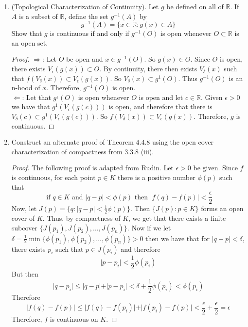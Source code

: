 \begin{enumerate}
    \item (Topological Characterization of Continuity). Let \( g \) be defined on all of \( \mathbb{R} \). If \( A \) is a subset of \( \mathbb{R} \), define the set \( g^{-1}(A) \) by
    \[
    g^{-1}(A) = \{ x \in \mathbb{R}: g(x) \in A \}
    \]
    Show that \( g \) is continuous if and only if \( g^{-1}(O) \) is open whenever \( O \subset \mathbb{R} \) is an open set.
    
    \begin{proof}
    \( \Rightarrow \): Let \( O \) be open and \( x \in g^{-1}(O) \). So \( g(x) \in O \). Since \( O \) is open, there exists \( V_{\epsilon}(g(x)) \subset O \). By continuity, there then exists \( V_{\delta}(x) \) such that \( f\left( V_{\delta}(x) \right) \subset V_{\epsilon}(g(x)) \). So \( V_{\delta}(x) \subset g^{1}(O) \). Thus \( g^{-1}(O) \) is an n-hood of \( x \). Therefore, \( g^{-1}(O) \) is open. 
    \\
    \(\Leftarrow \): Let that \( g^{_1}(O) \) is open whenever \( O \) is open and let \( c \in \mathbb{R} \). Given \( \epsilon > 0 \) we have that \( g^{1}(V_{\epsilon}(g(c))) \) is open, and therefore that there is \( V_{\delta}(c) \subset g^{1}(V_{\epsilon}(g(c))) \). So \( f(V_{\delta}(x)) \subset V_{\epsilon}(g(x)) \). Therefore, \( g \) is continuous. 
    \end{proof}
    
    \item Construct an alternate proof of Theorem 4.4.8 using the open cover characterization of compactness from 3.3.8 (iii).
    
    \begin{proof}
        The following proof is adapted from Rudin. Let \( \epsilon > 0 \) be given. Since \( f \) is continuous, for each point \( p \in K \) there is a positive number \( \phi(p) \) such that
        \[
        \text{ if } q \in K \text{ and } \vert q - p \vert < \phi(p) \text{ then } \vert f(q) - f(p) \vert < \frac{\epsilon}{2}
        \]
        Now, let \( J(p) =\{ q: \vert q - p \vert < \frac{1}{2}\phi(p) \} \). Then \( \{ J(p): p \in K \} \) forms an open cover of \( K \). Thus, by compactness of \( K \), we get that there exists a finite subcover \( \{ J(p_{1}), J(p_{2}), \ldots, J(p_{n}) \} \). Now if we let \linebreak \( \delta = \frac{1}{2}\min\{ \phi(p_{1}), \phi(p_{2}), \ldots, \phi(p_{n}) \} > 0\) then we have that for \( \vert q - p \vert < \delta \), there exists \( p_{i} \) such that \( p \in J(p_{i}) \) and therefore
        \[
        \vert p - p_{i} \vert < \frac{1}{2}\phi(p_{i}) 
        \]
        But then 
        \[
        \vert q - p_{i} \vert \leq \vert q - p \vert + \vert p - p_{i} \vert < \delta + \frac{1}{2}\phi(p_{i}) < \phi(p_{i})
        \]
        Therefore 
        \[
        \vert f(q) - f(p) \vert \leq \vert f(q) - f(p_{i}) \vert + \vert f(p_{i}) - f(p) \vert < \frac{\epsilon}{2} + \frac{\epsilon}{2} = \epsilon
        \]
        Therefore, \( f \) is continuous on \( K \).
    \end{proof}
    

\end{enumerate}
